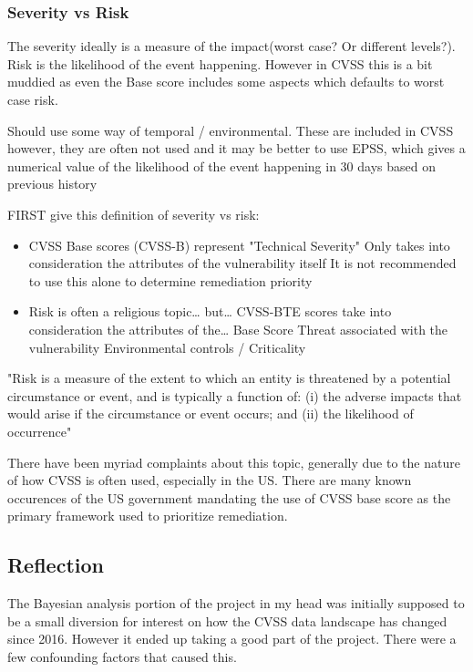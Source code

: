 \documentclass[12pt]{article}
\begin{document}
\subsubsection*{Severity vs Risk}

The severity ideally is a measure of the impact(worst case? Or different levels?). Risk is the
likelihood of the event happening. However in CVSS this is a bit muddied as even the Base score
includes some aspects which defaults to worst case risk.

Should use some way of temporal / environmental. These are included in CVSS however, they are often
not used and it may be better to use EPSS, which gives a numerical value of the likelihood of the
event happening in 30 days based on previous history

FIRST give this definition of severity vs risk:
\begin{itemize}
	\item CVSS Base scores (CVSS-B) represent "Technical Severity" Only takes into consideration the
	      attributes of the vulnerability itself It is not recommended to use this alone to determine
	      remediation priority

	\item Risk is often a religious topic… but… CVSS-BTE scores take into consideration the attributes of the…
	      Base Score Threat associated with the vulnerability Environmental controls / Criticality
\end{itemize}


"Risk is a measure of the extent to which an entity is threatened by a potential circumstance or event, and is
typically a function of: (i) the adverse impacts that would arise if the circumstance or event occurs; and (ii) the
likelihood of occurrence"

There have been myriad complaints about this topic, generally due to the nature of how CVSS is often
used, especially in the US. There are many known occurences of the US government mandating the use
of CVSS base score as the primary framework used to prioritize remediation.

\subsection{Reflection}

The Bayesian analysis portion of the project in my head was initially supposed to be a small
diversion for interest on how the CVSS data landscape has changed since 2016. However it ended up
taking a good part of the project. There were a few confounding factors that caused this.
\end{document}

